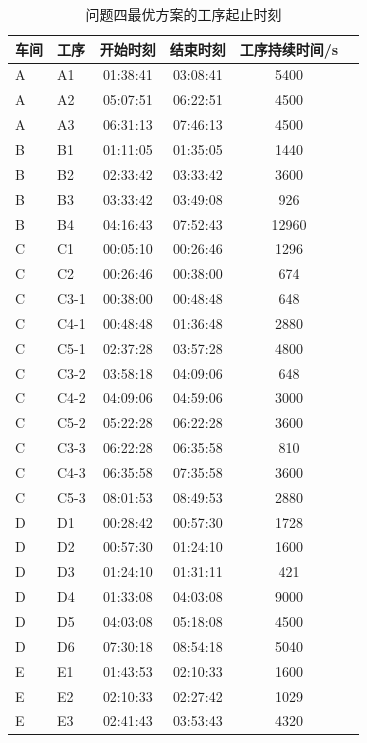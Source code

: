 \documentclass[12pt,a4paper]{article}
\begin{document}
\begin{table}[H]
\centering
\caption{问题四最优方案的工序起止时刻}
\small
\label{tab:p4schedule}
\begin{tabular}{llcccc}
\toprule
车间 & 工序 & 开始时刻 & 结束时刻 & 工序持续时间/s \\
\midrule
A & A1 & 01:38:41 & 03:08:41 & 5400 \\
A & A2 & 05:07:51 & 06:22:51 & 4500 \\
A & A3 & 06:31:13 & 07:46:13 & 4500 \\
\midrule
B & B1 & 01:11:05 & 01:35:05 & 1440 \\
B & B2 & 02:33:42 & 03:33:42 & 3600 \\
B & B3 & 03:33:42 & 03:49:08 & 926 \\
B & B4 & 04:16:43 & 07:52:43 & 12960 \\
\midrule
C & C1 & 00:05:10 & 00:26:46 & 1296 \\
C & C2 & 00:26:46 & 00:38:00 & 674 \\
C & C3-1 & 00:38:00 & 00:48:48 & 648 \\
C & C4-1 & 00:48:48 & 01:36:48 & 2880 \\
C & C5-1 & 02:37:28 & 03:57:28 & 4800 \\
C & C3-2 & 03:58:18 & 04:09:06 & 648 \\
C & C4-2 & 04:09:06 & 04:59:06 & 3000 \\
C & C5-2 & 05:22:28 & 06:22:28 & 3600 \\
C & C3-3 & 06:22:28 & 06:35:58 & 810 \\
C & C4-3 & 06:35:58 & 07:35:58 & 3600 \\
C & C5-3 & 08:01:53 & 08:49:53 & 2880 \\
\midrule
D & D1 & 00:28:42 & 00:57:30 & 1728 \\
D & D2 & 00:57:30 & 01:24:10 & 1600 \\
D & D3 & 01:24:10 & 01:31:11 & 421 \\
D & D4 & 01:33:08 & 04:03:08 & 9000 \\
D & D5 & 04:03:08 & 05:18:08 & 4500 \\
D & D6 & 07:30:18 & 08:54:18 & 5040 \\
\midrule
E & E1 & 01:43:53 & 02:10:33 & 1600 \\
E & E2 & 02:10:33 & 02:27:42 & 1029 \\
E & E3 & 02:41:43 & 03:53:43 & 4320 \\
\bottomrule
\end{tabular}
\end{table}
\end{document}
